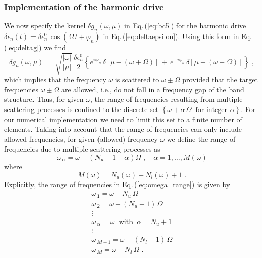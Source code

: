
\subsubsection{Implementation of the harmonic drive} \label{subsubsec:harmonic_drive}

We now specify the kernel $\delta g_n(\omega, \mu)$ in Eq.\,(\ref{eq:bc5}) 
for the harmonic drive $\delta \epsilon_n(t) = \delta \epsilon_n^0 \, \cos(\Omega \, t + \varphi_n)$
in Eq.\,(\ref{eq:deltaepsilon}). Using this form in Eq.\,(\ref{eq:deltag}) we find
%
\begin{equation} \label{eq:deltag_harm}
\delta g_n(\omega, \mu) \, = \, \sqrt{\frac{|\omega|}{|\mu|}} \, \frac{\delta \epsilon_n^0}{2} 
\left\{
e^{i \varphi_n} \, \delta\left[\mu - (\omega + \Omega)\right] \, + \,  
e^{- i \varphi_n} \, \delta\left[\mu - (\omega - \Omega)\right]
\right\} \, \, ,
\end{equation}
%
which implies that the frequency $\omega$ is scattered to $\omega \pm \Omega$
provided that the target frequencies $\omega \pm \Omega$ are allowed, i.e., 
do not fall in a frequency gap of the band structure. 
Thus, for given $\omega$, the range of frequencies resulting from multiple scattering 
processes is confined to the discrete set 
$\left\{\omega + \alpha \, \Omega \, \, \, \text{for integer} \, \, \alpha \right\}$. 
For our numerical implementation we need to limit this set to a finite number 
of elements. Taking into account that the range of frequencies can only include 
allowed frequencies, for given (allowed) frequency $\omega$ we define the range of 
frequencies due to multiple scattering processes as
%
\begin{equation} \label{eq:omega_range}
\omega_{\,\alpha} = \omega + \left( N_u + 1 - \alpha \right) \Omega \, \, , \quad \alpha = 1, \ldots, M(\omega)
\end{equation}
%
where 
%
\begin{equation} \label{eq:def_m}
M(\omega) = N_u(\omega) + N_l(\omega) + 1 \, \, .
\end{equation}
%
Explicitly, the range of frequencies in Eq.\,(\ref{eq:omega_range}) is given by 
%
\begin{equation} \label{eq:table}
\begin{array}{l}
\omega_{\,1} = \omega + N_u \, \Omega \\
\omega_{\,2} = \omega + (N_u - 1) \, \Omega \\
\vdots \\
\omega_{\,\alpha} = \omega \, \, \, \, \text{with} \, \, \, \alpha = N_u + 1 \\
\vdots \\
\omega_{\,M-1} = \omega - (N_l - 1) \, \Omega \\
\omega_{\,M} = \omega - N_l \, \Omega \, \, .
\end{array}
\end{equation}
